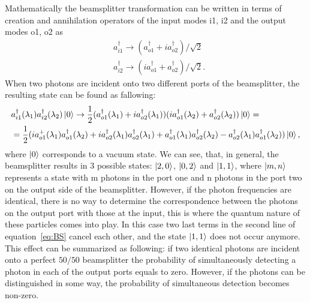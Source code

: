 Mathematically the beamsplitter transformation can be written in terms of creation and annihilation operators of the input modes i1, i2 and the output modes o1, o2 as
\begin{equation}
\begin{aligned}
& a_{i1}^{\dagger} \rightarrow (a_{o1}^{\dagger} + ia_{o2}^{\dagger} )/\sqrt{2} \\
& a_{i2}^{\dagger} \rightarrow (ia_{o1}^{\dagger} + a_{o2}^{\dagger} )/\sqrt{2}.
\end{aligned}
\end{equation}
When two photons are incident onto two different ports of the beamsplitter, the resulting state can be found as fallowing:
\begin{equation}
\begin{split}
& a_{i1}^{\dagger}(\lambda_1) a^{\dagger}_{i2}(\lambda_2) \left|0\right\rangle \rightarrow  \frac{1}{2} (a_{o1}^{\dagger}(\lambda_1) +ia_{o2}^{\dagger}(\lambda_1) ) (ia_{o1}^{\dagger}(\lambda_2) +a_{o2}^{\dagger}(\lambda_2) )\left|0\right\rangle = \\
&=\frac{1}{2} (i a_{o1}^+(\lambda_1) a_{o1}^{\dagger}(\lambda_2) + ia_{o2}^{\dagger}(\lambda_1)a_{o2}^{\dagger}(\lambda_1) +a_{o1}^{\dagger}(\lambda_1) a_{o2}^{\dagger}(\lambda_2) - a_{o2}^{\dagger}(\lambda_1) a_{o1}^{\dagger}(\lambda_2))\left|0\right\rangle,
\end{split}
\label{eq:BS}
\end{equation}
where $\left|0\right\rangle$ corresponds to a vacuum state. We can see, that, in general, the beamsplitter results in $3$ possible states: $\left|2,0\right\rangle$, $\left|0,2\right\rangle$ and $\left|1,1\right\rangle$, where $\left|m,n\right\rangle$ represents a state with m photons in the port one and n photons in the port two on the output side of the beamsplitter. However, if the photon frequencies are identical, there is no way to determine the correspondence between the photons on the output port with those at the input, this is where the quantum nature of these particles comes into play. In this case two last terms in the second line of equation~\ref{eq:BS} cancel each other, and the state $\left|1,1\right\rangle$ does not occur anymore. This effect can be summarized as following: if two identical photons are incident onto a perfect $50/50$ beamsplitter the probability of simultaneously detecting a photon in each of the output ports equals to zero. However, if the photons can be distinguished in some way, the probability of simultaneous detection becomes non-zero.

